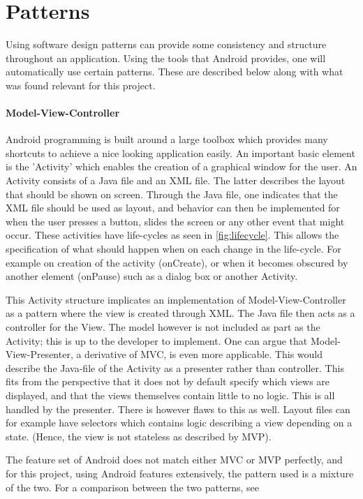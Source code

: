 \section{Patterns}
\label{sec:patterns}

Using software design patterns can provide some consistency and structure throughout an application. Using the tools that Android provides, one will automatically use certain patterns. These are described below along with what was found relevant for this project.

\paragraph{Model-View-Controller}
Android programming is built around a large toolbox which provides many shortcuts to achieve a nice looking application easily. An important basic element is the 'Activity' which enables the creation of a graphical window for the user. An Activity consists of a Java file and an XML file. The latter describes the layout that should be shown on screen. Through the Java file, one indicates that the XML file should be used as layout, and behavior can then be implemented for when the user presses a button, slides the screen or any other event that might occur. These activities have life-cycles as seen in \ref{fig:lifecycle}. This allows the specification of what should happen when on each change in the life-cycle. For example on creation of the activity (onCreate), or when it becomes obscured by another element (onPause) such as a dialog box or another Activity.

This Activity structure implicates an implementation of Model-View-Controller as a pattern where the view is created through XML. The Java file then acts as a controller for the View. The model however is not included as part as the Activity; this is up to the developer to implement. One can argue that Model-View-Presenter, a derivative of MVC, is even more applicable. This would describe the Java-file of the Activity as a presenter rather than controller. This fits from the perspective that it does not by default specify which views are displayed, and that the views themselves contain little to no logic. This is all handled by the presenter. There is however flaws to this as well. Layout files can for example have selectors which contains logic describing a view depending on a state. (Hence, the view is not stateless as described by MVP).

The feature set of Android does not match either MVC or MVP perfectly, and for this project, using Android features extensively, the pattern used is a mixture of the two. For a comparison between the two patterns, see \citep{MVC_MVP}


